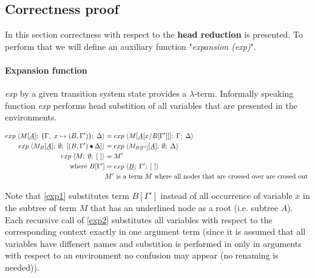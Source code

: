 \documentclass[a4paper, 10pt]{article}
\begin{document}
\subsection{Correctness proof}
In this section correctness with respect to the \textbf{head reduction} is presented.
To perform that we will define an auxiliary function "\emph{expansion (exp)}".

\paragraph{Expansion function} 
\emph{exp} by a given transition system state provides a $\lambda$-term.
Informally speaking function \emph{exp} performs head substition of all
variables that are presented in the environments.

\begin{align}
  \label{exp1} exp\; \langle M[\underline{A}];\; \{\Gamma,\ x \mapsto (B, \Gamma')\};\; \Delta \rangle
  &= exp\; \langle M[\underline{A}[x / B[\Gamma']]];\; \Gamma;\; \Delta \rangle \\
  \label{exp2} exp\; \langle M_B[\underline{A}];\; \emptyset;\; [(B,\Gamma')\bullet\Delta] \rangle
  &= exp\; \langle M_{B[\Gamma']}[\underline{A}];\; \emptyset;\; \Delta \rangle\\
  \label{exp3} exp\; \langle M;\; \emptyset;\; [\ ] \rangle &= M' \\
  \textnormal{where } B[\Gamma'] &= exp\; \langle \underline{B};\; \Gamma';\; [\ ] \rangle \\
  & M' \textnormal{ is a term } M \textnormal{ where all nodes that are crossed over are crosed out }
\end{align}

Note that \eqref{exp1} substitutes term $B[\Gamma']$ instead of all occurrence of variable $x$ in the subtree of term $M$ that has an underlined node as a root (i.e. subtree $A$). Each recursive call of \eqref{exp2} substitutes all variables with respect to the corresponding context exactly in one argument term (since it is assumed that all variables have diffenert names and
substition is performed in only in arguments with respect to an environment no confusion may appear (no renaming is needed)).
\end{document}
